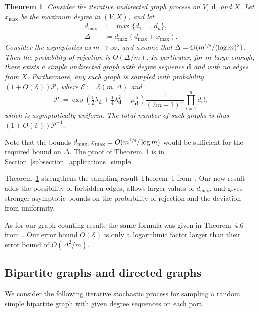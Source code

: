 \documentclass{article}
\theoremstyle{plain}
\newtheorem{theorem}{Theorem}[section]
\theoremstyle{remark}
\theoremstyle{plain}
\numberwithin{equation}{section}
\renewcommand{\d}{{\boldsymbol{d}}}
\begin{document}
	\begin{theorem}\label{theorem_simple}
		Consider the iterative undirected graph process on $V$, $\d$, and $X$. Let $x_{\max}$ be the maximum degree in $(V,X)$, and let
		\begin{align}
			d_{\max}&:=\max\{d_1,\ldots,d_n\},
			\\\Delta&:=d_{\max}(d_{\max}+x_{\max}).
		\end{align}
		Consider the asymptotics as $m\to\infty$, and assume that $\Delta=O(m^{\sfrac12}/(\log m)^2)$. Then the probability of rejection is $O(\Delta/m)$. In particular, for $m$ large enough, there exists a simple undirected graph with degree sequence $\d$ and with no edges from $X$. Furthermore, any such graph is sampled with probability $(1+O(\mathscr{E}))\mathscr{P}$, where $\mathscr{E}:=\mathscr{E}(m,\Delta)$ and $$\mathscr{P}:=\exp(\tfrac12\lambda_\d+\tfrac14\lambda_\d^2+\mu_{\d}^{X})\frac1{(2m-1)!!}\prod_{i=1}^{n}d_i!,$$ which is asymptotically uniform. The total number of such graphs is thus $(1+O(\mathscr{E}))\mathscr{P}^{-1}$.
	\end{theorem}
	
	Note that the bounds $d_{\max},x_{\max}=O(m^{\sfrac14}/\log m)$ would be sufficient for the required bound on $\Delta$. The proof of Theorem~\ref{theorem_simple} is in Section~\ref{subsection_applications_simple}.
	
	Theorem~\ref{theorem_simple} strengthens the sampling result Theorem~1 from~\cite{Bayati}. Our new result adds the possibility of forbidden edges, allows larger values of $d_{\max}$, and gives stronger asymptotic bounds on the probability of rejection and the deviation from uniformity.
	
	As for our graph counting result, the same formula was given in Theorem~4.6 from~\cite{mckay1985asymptotics}. Our error bound $O(\mathscr{E})$ is only a logarithmic factor larger than their error bound of $O(\Delta^2/m)$.
	
	\subsection{Bipartite graphs and directed graphs}\label{subsection_results_bipartite}
	
	We consider the following iterative stochastic process for sampling a random simple bipartite graph with given degree sequences on each part.
	
\end{document}
